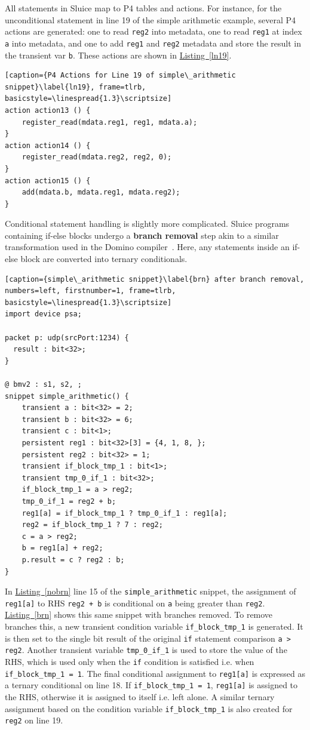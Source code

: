 \documentclass[12pt, oneside]{article}
\newcommand{\irref}[2]{\hyperref[#2]{#1~\ref{#2}}}
\begin{document}
All statements in Sluice map to P4 tables and actions. For instance, for the unconditional statement in line 19 of the simple arithmetic example, several P4 actions are generated: one to read \texttt{reg2} into metadata, one to read \texttt{reg1} at index \texttt{a} into metadata, and one to add \texttt{reg1} and \texttt{reg2} metadata and store the result in the transient var \texttt{b}. These actions are shown in \irref{Listing}{ln19}.   

\begin{lstlisting}[caption={P4 Actions for Line 19 of simple\_arithmetic snippet}\label{ln19}, frame=tlrb, basicstyle=\linespread{1.3}\scriptsize]
action action13 () {
    register_read(mdata.reg1, reg1, mdata.a);
}
action action14 () {
    register_read(mdata.reg2, reg2, 0);
}
action action15 () {
    add(mdata.b, mdata.reg1, mdata.reg2);
}
\end{lstlisting}

Conditional statement handling is slightly more complicated. Sluice programs containing if-else blocks undergo a \textbf{branch removal} step akin to a similar transformation used in the Domino compiler~\cite{domino}. Here, any statements inside an if-else block are converted into ternary conditionals. 

\begin{lstlisting}[caption={simple\_arithmetic snippet}\label{brn} after branch removal, numbers=left, firstnumber=1, frame=tlrb, basicstyle=\linespread{1.3}\scriptsize]
import device psa;

packet p: udp(srcPort:1234) {
  result : bit<32>;
}

@ bmv2 : s1, s2, ;
snippet simple_arithmetic() {
    transient a : bit<32> = 2;
    transient b : bit<32> = 6;
    transient c : bit<1>;
    persistent reg1 : bit<32>[3] = {4, 1, 8, };
    persistent reg2 : bit<32> = 1;
    transient if_block_tmp_1 : bit<1>;
    transient tmp_0_if_1 : bit<32>;
    if_block_tmp_1 = a > reg2;
    tmp_0_if_1 = reg2 + b;
    reg1[a] = if_block_tmp_1 ? tmp_0_if_1 : reg1[a];
    reg2 = if_block_tmp_1 ? 7 : reg2;
    c = a > reg2;
    b = reg1[a] + reg2;
    p.result = c ? reg2 : b;
}
\end{lstlisting}

In \irref{Listing}{nobrn} line 15 of the \texttt{simple\_arithmetic} snippet, the assignment of \texttt{reg1[a]} to RHS \texttt{reg2 + b} is conditional on \texttt{a} being greater than \texttt{reg2}. \irref{Listing}{brn} shows this same snippet with branches removed. To remove branches this, a new transient condition variable \texttt{if\_block\_tmp\_1} is generated. It is then set to the single bit result of the original \texttt{if} statement comparison \texttt{a > reg2}. Another transient variable \texttt{tmp\_0\_if\_1} is used to store the value of the RHS, which is used only when the \texttt{if} condition is satisfied i.e. when \texttt{if\_block\_tmp\_1 = 1}. The final conditional assignment to \texttt{reg1[a]} is expressed as a ternary conditional on line 18. If \texttt{if\_block\_tmp\_1 = 1}, \texttt{reg1[a]} is assigned to the RHS, otherwise it is assigned to itself i.e. left alone. A similar ternary assignment based on the condition variable \texttt{if\_block\_tmp\_1} is also created for \texttt{reg2} on line 19. 
\end{document}
